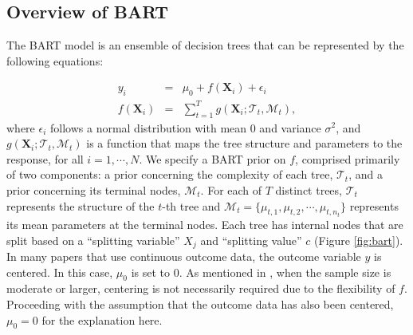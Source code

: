 \subsection{Overview of BART}
The BART model \citep{chipman2010bart} is an ensemble of decision trees that can be represented by the following equations:
%

\begin{eqnarray*}
y_i &=&  \mu_0+f(\boldsymbol{X}_i) + \epsilon_i \\
 f(\boldsymbol{X}_i) &=& \sum_{t=1}^T g(\boldsymbol{X}_i ; \mathcal{T}_t, \mathcal{M}_t),
\end{eqnarray*}
%
where $\epsilon_i$ follows a normal distribution with mean 0 and variance $\sigma^2$, and $g(\boldsymbol{X}_i; \mathcal{T}_t, \mathcal{M}_t)$ is a function that maps the tree structure and parameters to the response, for all $i=1, \cdots, N$. We specify a BART prior on $f$, comprised primarily of two components: a prior concerning the complexity of each tree, $\mathcal{T}_t$, and a prior concerning its terminal nodes, $\mathcal{M}_t$. For each of $T$ distinct trees, $\mathcal{T}_t$ represents the structure of the $t$-th tree and $\mathcal{M}_t = \{\mu_{t,1}, \mu_{t,2}, \cdots, \mu_{t,n_t}\}$ represents its mean parameters at the terminal nodes. Each tree has internal nodes that are split based on a ``splitting variable'' $X_j$ and ``splitting value'' $c$ (Figure \ref{fig:bart}). In many papers that use continuous outcome data, the outcome variable $y$ is centered. In this case, $\mu_0$ is set to $0$. As mentioned in \cite{sparapani2016nonparametric}, when the sample size is moderate or larger, centering is not necessarily required due to the flexibility of $f$. Proceeding with the assumption that the outcome data has also been centered, $\mu_0 = 0$ for the explanation here.

